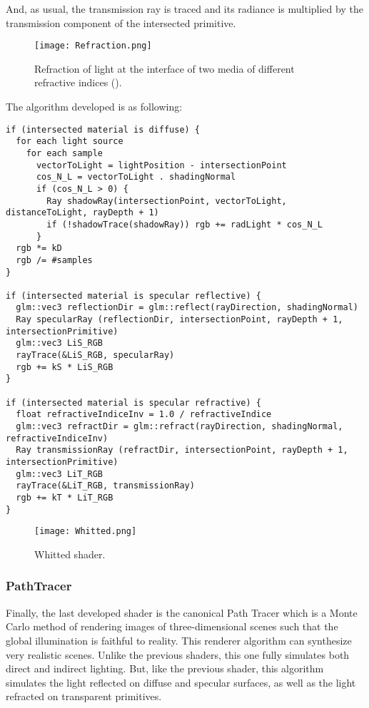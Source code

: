 And, as usual, the transmission ray is traced and its radiance is multiplied by the transmission component of the intersected primitive.

\begin{figure}[H]
	\centering
	\caption{Refraction of light at the interface of two media of different refractive indices (\cite{RTRefractions}).}
	\label{Refraction.}
	\texttt{[image: Refraction.png]}
\end{figure}

\par
The algorithm developed is as following:

\begin{lstlisting}[caption={Algorithm of Whitted Shader}, captionpos=b, label=Whitted]
if (intersected material is diffuse) {
  for each light source
    for each sample
      vectorToLight = lightPosition - intersectionPoint
      cos_N_L = vectorToLight . shadingNormal
      if (cos_N_L > 0) {
        Ray shadowRay(intersectionPoint, vectorToLight, distanceToLight, rayDepth + 1)
        if (!shadowTrace(shadowRay)) rgb += radLight * cos_N_L
      }
  rgb *= kD
  rgb /= #samples
}

if (intersected material is specular reflective) {
  glm::vec3 reflectionDir = glm::reflect(rayDirection, shadingNormal)
  Ray specularRay (reflectionDir, intersectionPoint, rayDepth + 1, intersectionPrimitive)
  glm::vec3 LiS_RGB
  rayTrace(&LiS_RGB, specularRay)
  rgb += kS * LiS_RGB
}

if (intersected material is specular refractive) {
  float refractiveIndiceInv = 1.0 / refractiveIndice
  glm::vec3 refractDir = glm::refract(rayDirection, shadingNormal, refractiveIndiceInv)
  Ray transmissionRay (refractDir, intersectionPoint, rayDepth + 1, intersectionPrimitive)
  glm::vec3 LiT_RGB
  rayTrace(&LiT_RGB, transmissionRay)
  rgb += kT * LiT_RGB
}
\end{lstlisting}

\begin{figure}[H]
	\centering
	\caption{Whitted shader.}
	\label{Whitted shader.}
	\texttt{[image: Whitted.png]}
\end{figure}


\subsubsection{PathTracer}

\par
Finally, the last developed shader is the canonical Path Tracer which is a Monte Carlo method of rendering images of three-dimensional scenes such that the global illumination is faithful to reality.
This renderer algorithm can synthesize very realistic scenes.
Unlike the previous shaders, this one fully simulates both direct and indirect lighting.
But, like the previous shader, this algorithm simulates the light reflected on diffuse and specular surfaces, as well as the light refracted on transparent primitives.

